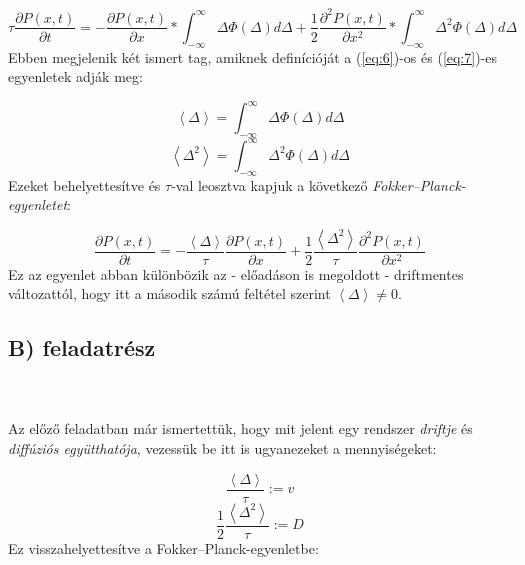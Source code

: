 \begin{equation}
    \tau \frac{\partial P \left( x, t \right)}{\partial t}
    =
    -
    \frac{\partial P \left( x, t \right)}{\partial x} * \int_{-\infty}^{\infty} \Delta \Phi \left( \Delta \right) d \Delta
    +
    \frac{1}{2} \frac{\partial^{2} P \left( x, t \right)}{\partial x^{2}} * \int_{-\infty}^{\infty} \Delta^{2} \Phi \left( \Delta \right) d \Delta
\end{equation}
Ebben megjelenik két ismert tag, amiknek definícióját a (\ref{eq:6})-os és (\ref{eq:7})-es egyenletek adják meg:

\begin{equation}
    \left< \Delta \right> = \int_{-\infty}^{\infty} \Delta \Phi \left( \Delta \right) d \Delta
\end{equation}
\begin{equation}
    \left< \Delta^{2} \right> = \int_{-\infty}^{\infty} \Delta^{2} \Phi \left( \Delta \right) d \Delta
\end{equation}
Ezeket behelyettesítve és $\tau$-val leosztva kapjuk a következő \emph{Fokker--Planck-egyenletet}:

\begin{equation}
    \boxed{\frac{\partial P \left( x, t \right)}{\partial t}
    =
    -
    \frac{\left< \Delta \right>}{\tau} \frac{\partial P \left( x, t \right)}{\partial x}
    +
    \frac{1}{2} \frac{\left< \Delta^{2} \right>}{\tau} \frac{\partial^{2} P \left( x, t \right)}{\partial x^{2}}}
\end{equation}
Ez az egyenlet abban különbözik az - előadáson is megoldott - driftmentes változattól, hogy itt a második számú feltétel szerint $\left< \Delta \right> \neq 0$.


\subsection*{B) feladatrész}
\\ \\
Az előző feladatban már ismertettük, hogy mit jelent egy rendszer \emph{driftje} és \emph{diffúziós együtthatója}, vezessük be itt is ugyanezeket a mennyiségeket:

\begin{equation}
    \frac{\left< \Delta \right>}{\tau} := v
\end{equation}
\begin{equation}
    \frac{1}{2} \frac{\left< \Delta^{2} \right>}{\tau} := D
\end{equation}
Ez visszahelyettesítve a Fokker--Planck-egyenletbe:

